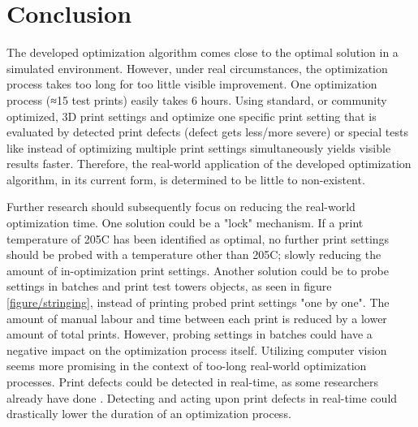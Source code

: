 \section{Conclusion}

The developed optimization algorithm comes close to the optimal solution in a simulated environment. However, under real circumstances, the optimization process takes too long for too little visible improvement. One optimization process (≈15 test prints) easily takes 6 hours. Using standard, or community optimized, 3D print settings and optimize one specific print setting that is evaluated by detected print defects (defect gets less/more severe) or special tests like \cite{teachingTechCalibration} instead of optimizing multiple print settings simultaneously yields visible results faster. Therefore, the real-world application of the developed optimization algorithm, in its current form, is determined to be little to non-existent. 

Further research should subsequently focus on reducing the real-world optimization time. One solution could be a "lock" mechanism. If a print temperature of 205\textdegree C has been identified as optimal, no further print settings should be probed with a temperature other than 205\textdegree C; slowly reducing the amount of in-optimization print settings. Another solution could be to probe settings in batches and print test towers objects, as seen in figure \ref{figure/stringing}, instead of printing probed print settings "one by one". The amount of manual labour and time between each print is reduced by a lower amount of total prints. However, probing settings in batches could have a negative impact on the optimization process itself. Utilizing computer vision seems more promising in the context of too-long real-world optimization processes. Print defects could be detected in real-time, as some researchers already have done \cite{khan2020real}. Detecting and acting upon print defects in real-time could drastically lower the duration of an optimization process. 

